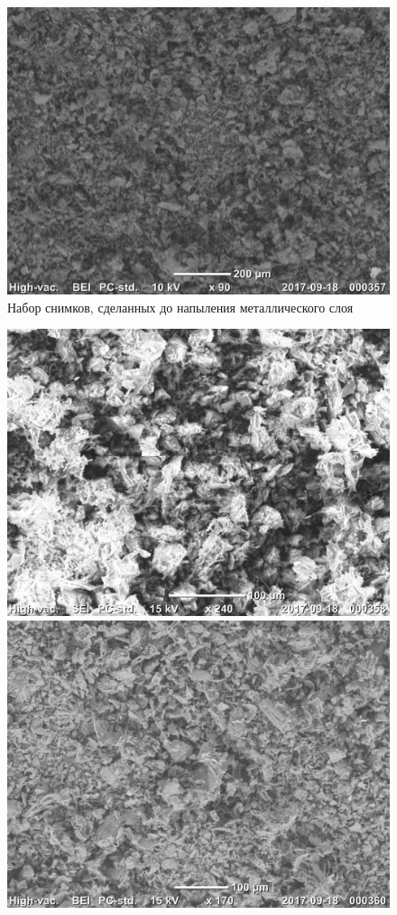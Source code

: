 \documentclass[12pt]{article}
\begin{document}
\begin{figure}[!ht]
	\includegraphics[scale=0.7]{pictures/20170918_000357.jpg}
	\caption{Набор снимков, сделанных до напыления металлического слоя}
\end{figure}

\begin{figure}[!ht]
	\centering
	\includegraphics[scale=0.7]{pictures/20170918_000358.jpg}
	\includegraphics[scale=0.7]{pictures/20170918_000360.jpg}
\end{figure}
\end{document}
